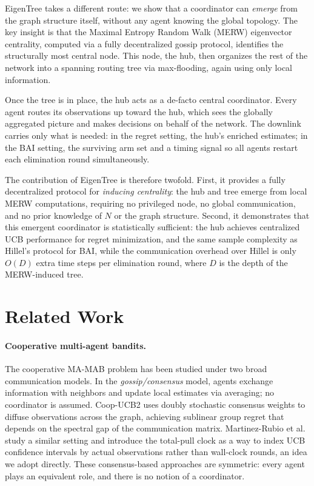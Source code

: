 \documentclass{article}
\newcommand{\merw}{EigenTree}
\begin{document}
\merw{} takes a different route: we show that a coordinator can \emph{emerge} from the graph structure itself, without any agent knowing the global topology. The key insight is that the Maximal Entropy Random Walk (MERW) eigenvector centrality, computed via a fully decentralized gossip protocol, identifies the structurally most central node. This node, the hub, then organizes the rest of the network into a spanning routing tree via max-flooding, again using only local information.

Once the tree is in place, the hub acts as a de-facto central coordinator. Every agent routes its observations up toward the hub, which sees the globally aggregated picture and makes decisions on behalf of the network. The downlink carries only what is needed: in the regret setting, the hub's enriched estimates; in the BAI setting, the surviving arm set and a timing signal so all agents restart each elimination round simultaneously.

The contribution of \merw{} is therefore twofold. First, it provides a fully decentralized protocol for \emph{inducing centrality}: the hub and tree emerge from local MERW computations, requiring no privileged node, no global communication, and no prior knowledge of $N$ or the graph structure. Second, it demonstrates that this emergent coordinator is statistically sufficient: the hub achieves centralized UCB performance for regret minimization, and the same sample complexity as Hillel's protocol for BAI, while the communication overhead over Hillel is only $O(D)$ extra time steps per elimination round, where $D$ is the depth of the MERW-induced tree.

\section{Related Work}
\label{sec:related}

\paragraph{Cooperative multi-agent bandits.}
The cooperative MA-MAB problem has been studied under two broad communication models. In the \emph{gossip/consensus} model, agents exchange information with neighbors and update local estimates via averaging; no coordinator is assumed. Coop-UCB2 \cite{landgren2021distributed} uses doubly stochastic consensus weights to diffuse observations across the graph, achieving sublinear group regret that depends on the spectral gap of the communication matrix. Martinez-Rubio et al.\ \cite{martinez2019decentralized} study a similar setting and introduce the total-pull clock as a way to index UCB confidence intervals by actual observations rather than wall-clock rounds, an idea we adopt directly. These consensus-based approaches are symmetric: every agent plays an equivalent role, and there is no notion of a coordinator.
\end{document}
